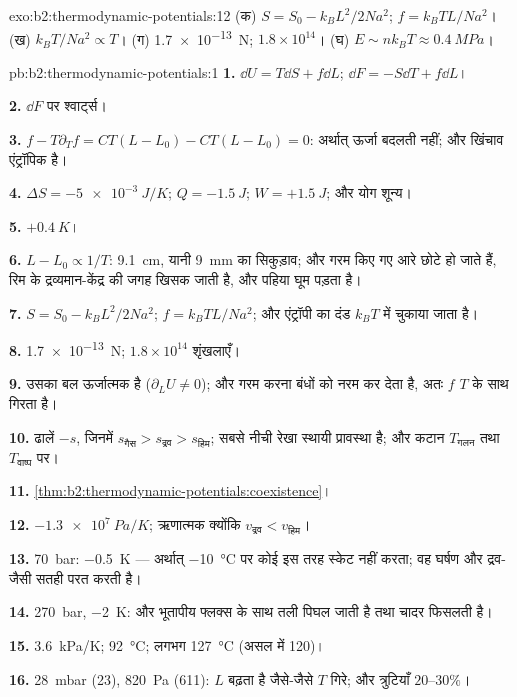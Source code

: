 \begin{solution}{exo:b2:thermodynamic-potentials:12}
(क) $S = S_0 - k_BL^2/2Na^2$; $f = k_BTL/Na^2$। (ख) $k_BT/Na^2 \propto T$। (ग)
\qty{1.7e-13}{N}; $1.8 \times 10^{14}$। (घ) $E \sim nk_BT \approx \qty{0.4}{MPa}$।
\end{solution}

\begin{solution}{pb:b2:thermodynamic-potentials:1}
\textbf{1.} $\dd U = T\dd S + f\dd L$; $\dd F = -S\dd T + f\dd L$।

\textbf{2.} $\dd F$ पर श्वार्ट्स।

\textbf{3.} $f - T\partial_Tf = CT(L - L_0) - CT(L - L_0) = 0$: अर्थात् ऊर्जा
बदलती नहीं; और खिंचाव एंट्रॉपिक है।

\textbf{4.} $\Delta S = \qty{-5e-3}{J/K}$; $Q = \qty{-1.5}{J}$; $W = +\qty{1.5}{J}$; और योग
शून्य।

\textbf{5.} $+\qty{0.4}{K}$।

\textbf{6.} $L - L_0 \propto 1/T$: \qty{9.1}{cm}, यानी \qty{9}{mm} का सिकुड़ाव; और
गरम किए गए आरे छोटे हो जाते हैं, रिम के द्रव्यमान-केंद्र की जगह खिसक जाती है, और पहिया
घूम पड़ता है।

\textbf{7.} $S = S_0 - k_BL^2/2Na^2$; $f = k_BTL/Na^2$; और एंट्रॉपी का दंड
$k_BT$ में चुकाया जाता है।

\textbf{8.} \qty{1.7e-13}{N}; $1.8 \times 10^{14}$ शृंखलाएँ।

\textbf{9.} उसका बल ऊर्जात्मक है ($\partial_LU \ne 0$); और गरम करना
बंधों को नरम कर देता है, अतः $f$ $T$ के साथ गिरता है।

\textbf{10.} ढालें $-s$, जिनमें $s_{\text{गैस}} > s_{\text{द्रव}} > s_{\text{हिम}}$; सबसे
नीची रेखा स्थायी प्रावस्था है; और कटान $T_{\text{गलन}}$ तथा $T_{\text{वाष्प}}$ पर।

\textbf{11.} \cref{thm:b2:thermodynamic-potentials:coexistence}।

\textbf{12.} $\qty{-1.3e7}{Pa/K}$; ऋणात्मक क्योंकि $v_{\text{द्रव}} < v_{\text{हिम}}$।

\textbf{13.} \qty{70}{bar}: \qty{-0.5}{K} --- अर्थात् \qty{-10}{\celsius} पर
कोई इस तरह स्केट नहीं करता; वह घर्षण और द्रव-जैसी सतही परत करती है।

\textbf{14.} \qty{270}{bar}, \qty{-2}{K}: और भूतापीय फ्लक्स के साथ
तली पिघल जाती है तथा चादर फिसलती है।

\textbf{15.} \qty{3.6}{kPa/K}; \qty{92}{\celsius}; लगभग \qty{127}{\celsius}
(असल में \qty{120}{})।

\textbf{16.} \qty{28}{mbar} (\qty{23}{}), \qty{820}{Pa} (\qty{611}{}): $L$ बढ़ता है जैसे-जैसे
$T$ गिरे; और त्रुटियाँ $20$--$30\%$।


\end{solution}
